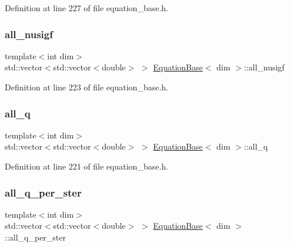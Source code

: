 Definition at line 227 of file equation\+\_\+base.\+h.

\mbox{\label{class_equation_base_a8c88d4b3e532cb639cea6e653dee5cfc}} 
\subsubsection{\texorpdfstring{all\+\_\+nusigf}{all\_nusigf}}
{\footnotesize\ttfamily template$<$int dim$>$ \\
std\+::vector$<$std\+::vector$<$double$>$ $>$ \hyperlink{class_equation_base}{Equation\+Base}$<$ dim $>$\+::all\+\_\+nusigf\hspace{0.3cm}{\ttfamily [protected]}}



Definition at line 223 of file equation\+\_\+base.\+h.

\mbox{\label{class_equation_base_add5be1036bc07500adc0d925020798a6}} 
\subsubsection{\texorpdfstring{all\+\_\+q}{all\_q}}
{\footnotesize\ttfamily template$<$int dim$>$ \\
std\+::vector$<$std\+::vector$<$double$>$ $>$ \hyperlink{class_equation_base}{Equation\+Base}$<$ dim $>$\+::all\+\_\+q\hspace{0.3cm}{\ttfamily [protected]}}



Definition at line 221 of file equation\+\_\+base.\+h.

\mbox{\label{class_equation_base_a6a633374c56fe767325b5c0860269fbf}} 
\subsubsection{\texorpdfstring{all\+\_\+q\+\_\+per\+\_\+ster}{all\_q\_per\_ster}}
{\footnotesize\ttfamily template$<$int dim$>$ \\
std\+::vector$<$std\+::vector$<$double$>$ $>$ \hyperlink{class_equation_base}{Equation\+Base}$<$ dim $>$\+::all\+\_\+q\+\_\+per\+\_\+ster\hspace{0.3cm}{\ttfamily [protected]}}



